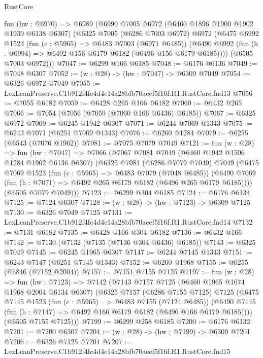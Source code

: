 \begin{lexlean}{RustCore}
\begin{coremodule}
  fun (hw : @6970) =>
  @6989
    (@6990
      @7005
      @6972
      (@6460 @1896 @1900 @1902 @1939 @6138 @6307)
      (@6325
        @7005
        (@6286 @7003 @6972)
        @6972
        (@6475
          @6992
          @1523
          (fun (c : @5965) => @6483 @7003 (@6971 @6485))
          (@6490 @6992 (fun (h : @6994) => @6492 @156 @6179 @6182 (@6496 @156 @6179 @6185))))
        (@6505 @7003 @6972)))
@7047 := @6299 @166 @6185
@7048 := @6176 @6136
@7049 := @7048 @6307
@7052 := (w : @28) -> (hw : @7047) -> @6309 @7049
@7054 := @6326 @6972 @7049
@7055 := LexLeanPreserve.C1b912f4fc4d4e14a28bfb70aeef5f16f.R1.RustCore.fnd13
@7056 := @7055 @6182
@7059 := @6428 @265 @166 @6182
@7060 := @6432 @265
@7066 := @7054 (@7056 (@7059 (@7060 @166 @6436) @6185))
@7067 := @6325 @6972
@7069 := @6245 @1942 @6307
@7071 := @6244 @7069 @1343
@7075 := @6243 @7071 (@6251 @7069 @1343)
@7076 := @6260 @1284
@7079 := @6255 (@6543 (@7076 @1962))
@7081 := @7075 @7079 @7049
@7121 := fun (w : @28) =>
  fun (hw : @7047) =>
  @7066
    (@7067
      @7081
      @7049
      (@6460 @1942 @1506 @1284 @1962 @6136 @6307)
      (@6325
        @7081
        (@6286 @7079 @7049)
        @7049
        (@6475
          @7069
          @1523
          (fun (c : @5965) => @6483 @7079 (@7048 @6485))
          (@6490 @7069 (fun (h : @7071) => @6492 @265 @6179 @6182 (@6496 @265 @6179 @6185))))
        (@6505 @7079 @7049)))
@7123 := @6299 @304 @6185
@7124 := @6176 @6134
@7125 := @7124 @6307
@7128 := (w : @28) -> (hw : @7123) -> @6309 @7125
@7130 := @6326 @7049 @7125
@7131 := LexLeanPreserve.C1b912f4fc4d4e14a28bfb70aeef5f16f.R1.RustCore.fnd14
@7132 := @7131 @6182
@7135 := @6428 @166 @304 @6182
@7136 := @6432 @166
@7142 := @7130 (@7132 (@7135 (@7136 @304 @6436) @6185))
@7143 := @6325 @7049
@7145 := @6245 @1965 @6307
@7147 := @6244 @7145 @1343
@7151 := @6243 @7147 (@6251 @7145 @1343)
@7152 := @6260 @1968
@7155 := @6255 (@6846 (@7152 @2004))
@7157 := @7151 @7155 @7125
@7197 := fun (w : @28) =>
  fun (hw : @7123) =>
  @7142
    (@7143
      @7157
      @7125
      (@6460 @1965 @1674 @1968 @2004 @6134 @6307)
      (@6325
        @7157
        (@6286 @7155 @7125)
        @7125
        (@6475
          @7145
          @1523
          (fun (c : @5965) => @6483 @7155 (@7124 @6485))
          (@6490 @7145 (fun (h : @7147) => @6492 @166 @6179 @6182 (@6496 @166 @6179 @6185))))
        (@6505 @7155 @7125)))
@7199 := @6299 @258 @6185
@7200 := @6176 @6132
@7201 := @7200 @6307
@7204 := (w : @28) -> (hw : @7199) -> @6309 @7201
@7206 := @6326 @7125 @7201
@7207 := LexLeanPreserve.C1b912f4fc4d4e14a28bfb70aeef5f16f.R1.RustCore.fnd15

\end{coremodule}
\end{lexlean}
